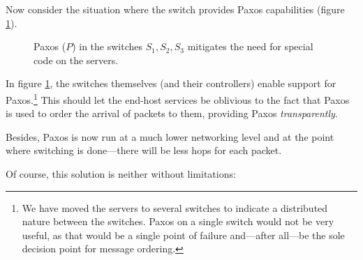 Now consider the situation where the switch provides Paxos
capabilities (figure \ref{figure:paxos.on.switches}).

\begin{figure}[H]
  \centering
  \caption{Paxos ($P$) in the switches $S_1, S_2, S_3$ mitigates the need for special code on the servers.}
  \label{figure:paxos.on.switches}
\end{figure}

In figure \ref{figure:paxos.on.switches}, the switches themselves (and their
controllers) enable
support for Paxos.\footnote{We have moved the servers to several switches
to indicate a distributed nature between the switches.
Paxos on a single switch would not be very useful, as that would be a single
point of failure and---after all---be the sole decision point for message
ordering.}
%
This should let the end-host services be oblivious to the fact that Paxos is
used to order the arrival of packets to them, providing Paxos
\textit{transparently}.

Besides, Paxos is now run at a much lower networking level and at the point where switching is done---there will be less hops
for each packet.

Of course, this solution is neither without limitations:


